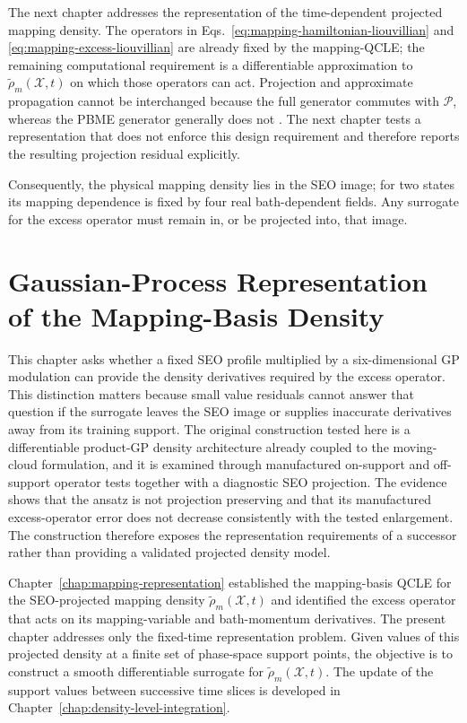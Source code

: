 \documentclass[
  11pt,
  letterpaper,
  onehalfspacing,
  normalmargins,
  equalmargins,
  oneside
]{ut-thesis}
\begin{document}
The next chapter addresses the representation of the time-dependent projected
mapping density. The operators in
Eqs.~\eqref{eq:mapping-hamiltonian-liouvillian} and
\eqref{eq:mapping-excess-liouvillian} are already fixed by the mapping-QCLE;
the remaining computational requirement is a differentiable approximation to
\(\tilde\rho_m(\boldsymbol{\mathcal X},t)\) on which those operators can act.
Projection and approximate propagation cannot be interchanged because the
full generator commutes with \(\mathcal P\), whereas the PBME generator
generally does not \cite{Kelly2012JCP}. The next chapter tests a representation
that does not enforce this design requirement and therefore reports the
resulting projection residual explicitly.

Consequently, the physical mapping density lies in the SEO image; for two states its mapping
dependence is fixed by four real bath-dependent fields.  Any surrogate for the
excess operator must remain in, or be projected into, that image.

\chapter{Gaussian-Process Representation of the Mapping-Basis Density}
\label{chap:gp-density-representation}

This chapter asks whether a fixed SEO profile multiplied by a six-dimensional
GP modulation can provide the density derivatives required by the excess
operator.  This distinction matters because small value residuals cannot
answer that question if the surrogate
leaves the SEO image or supplies inaccurate derivatives away from its training
support.  The original construction tested here is a differentiable product-GP
density architecture already coupled to the moving-cloud formulation, and it is
examined through manufactured on-support and off-support operator tests together
with a diagnostic SEO projection.  The evidence shows that the ansatz is not
projection preserving and that its manufactured excess-operator error does not
decrease consistently with the tested enlargement.  The construction therefore
exposes the representation requirements of a successor rather than providing a
validated projected density model.

Chapter~\ref{chap:mapping-representation} established the mapping-basis QCLE
for the SEO-projected mapping density
\(\tilde\rho_m(\boldsymbol{\mathcal X},t)\) and identified the excess
operator that acts on its mapping-variable and bath-momentum derivatives. The
present chapter addresses only the fixed-time representation problem. Given
values of this projected density at a finite set of phase-space support
points, the objective is to construct a smooth differentiable surrogate for
\(\tilde\rho_m(\boldsymbol{\mathcal X},t)\). The update of the support
values between successive time slices is developed in
Chapter~\ref{chap:density-level-integration}.
\end{document}

